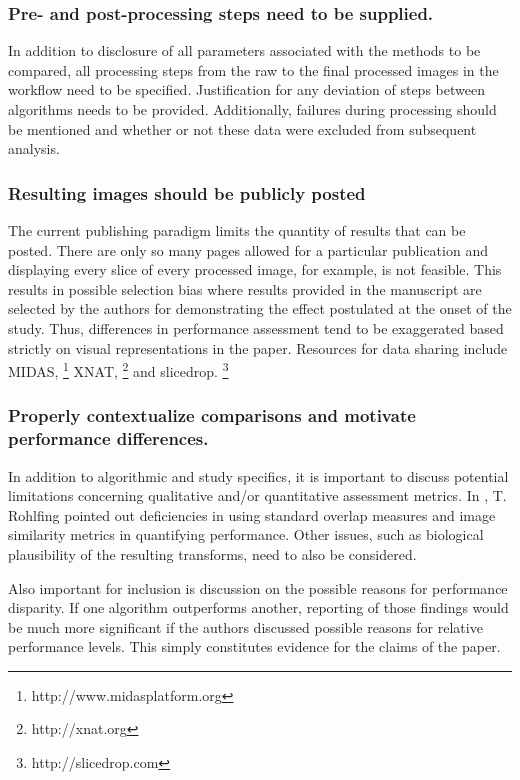 \documentclass[final,5p,times,twocolumn]{elsarticle}
\begin{document}
\subsubsection{Pre- and post-processing steps need to be supplied.}
In addition to disclosure of all parameters associated with the
methods to be compared, all processing steps from the raw 
to the final processed images in the workflow
need to be specified.    Justification for any deviation
of steps between algorithms needs to be provided.  Additionally,
failures during processing should be mentioned and whether
or not these data were excluded from subsequent analysis.  


\subsubsection{Resulting images should be publicly posted}

The current publishing paradigm limits the quantity of
results that can be posted.  There are only so many pages
allowed for a particular publication and displaying every
slice of every processed image, for example, is not feasible.  
This results in possible selection bias where results provided
in the manuscript are selected by the authors for demonstrating 
the effect postulated at the onset of the study.  Thus, differences
in performance assessment tend to be exaggerated based strictly
on visual representations in the paper.  Resources for data
sharing include MIDAS,%
\footnote{
http://www.midasplatform.org
}
XNAT,%
\footnote{
http://xnat.org
}
and slicedrop.%
\footnote{
http://slicedrop.com
}


\subsubsection{Properly contextualize comparisons and motivate performance differences.}
In addition to algorithmic and study specifics, it is important to 
discuss potential limitations concerning qualitative and/or quantitative 
assessment metrics.  In \cite{rohlfing2012}, T. Rohlfing pointed out 
deficiencies in using standard overlap measures and image similarity
metrics in quantifying performance.  Other issues, such as biological
plausibility of the resulting transforms, need to also be considered.

Also important for inclusion is discussion on the possible reasons for performance
disparity.  If one algorithm outperforms another, reporting of those findings 
would be much more significant if the authors discussed possible reasons
for relative  performance levels.  This simply constitutes evidence for
the claims of the paper.
\end{document}
